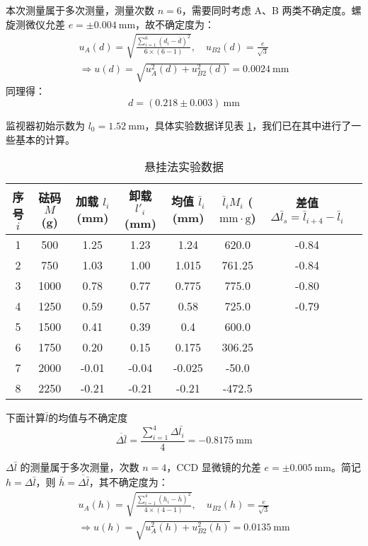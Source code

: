 \documentclass[11pt]{article}
\begin{document}
	本次测量属于多次测量，测量次数 $n = 6$，需要同时考虑 A、B 两类不确定度。螺旋测微仪允差 $e = \pm 0.004 \ \mathrm{mm}$，故不确定度为：
	\begin{gather*}
		u_A(d) = \sqrt{\frac{\sum_{i=1}^{6}\left(d_i - \bar{d}\right)^2}{6\times (6 - 1)}} ,\quad u_{B2}(d) = \frac{e}{\sqrt{3}} \\ 
		\Longrightarrow 
		u(d) = \sqrt{u_A^2(d) + u_{B2}^2(d)} = 0.0024 \ \mathrm{mm}
	\end{gather*}
	同理得：
	\[d=(0.218 \pm 0.003)\ \mathrm{mm}\]
	
	监视器初始示数为 $l_0 = 1.52 \ \mathrm{mm}$，具体实验数据详见表 \ref{悬挂法实验数据}，我们已在其中进行了一些基本的计算。
	\begin{table}[H]\centering
		\caption{悬挂法实验数据}
		\label{悬挂法实验数据}
		\begin{tabular}{cccccccc} 
			\toprule
			序号 $i$ & 砝码 $M$ (g) & 加载 $l_i$ (mm) & 卸载 $l'_i$ (mm) & 均值 $\bar{l}_i$ (mm)  & $\bar{l}_i M_i$ ($\mathrm{mm}\cdot\mathrm{g}$)  & 差值 $\Delta \bar{l}_s = \bar{l}_{i+4} -\bar{l}_{i} $ \\
			\midrule
			1 & 500 & 1.25 & 1.23 & 1.24 & 620.0 & -0.84 \\
			2 & 750 & 1.03 & 1.00 & 1.015 & 761.25 & -0.84 \\
			3 & 1000 & 0.78 & 0.77 & 0.775 & 775.0 & -0.80 \\
			4 & 1250 & 0.59 & 0.57 & 0.58 & 725.0 & -0.79 \\
			5 & 1500 & 0.41 & 0.39 & 0.4 & 600.0 & \\
			6 & 1750 & 0.20 & 0.15 & 0.175 & 306.25 & \\
			7 & 2000 & -0.01 & -0.04 & -0.025 & -50.0 & \\
			8 & 2250 & -0.21 & -0.21 & -0.21 & -472.5 & \\
			\bottomrule
		\end{tabular}
	\end{table}
	
	下面计算$\bar{l}$的均值与不确定度
	\[\overline{\Delta \bar{l}} = \frac{\sum_{i=1}^{4} \Delta \bar{l_i}}{4} = -0.8175 \ \mathrm{mm}\]
	
	$\Delta \bar{l}$ 的测量属于多次测量，次数 $n = 4$，CCD 显微镜的允差 $e = \pm 0.005 \ \mathrm{mm}$。简记 $h = \Delta \bar{l}$，则 $\bar{h} = \overline{\Delta \bar{l}}$，其不确定度为：
	\begin{gather*}
		u_A(h) = \sqrt{\frac{\sum_{i=1}^{4}\left(h_i - \overline{h}\right)^2}{4\times (4 - 1)}} ,\quad u_{B2}(h) = \frac{e}{\sqrt{3}} \\ 
		\Longrightarrow
		u(h) = \sqrt{u_A^2(h) + u_{B2}^2(h)} = 0.0135 \ \mathrm{mm}
	\end{gather*}
	
\end{document}
